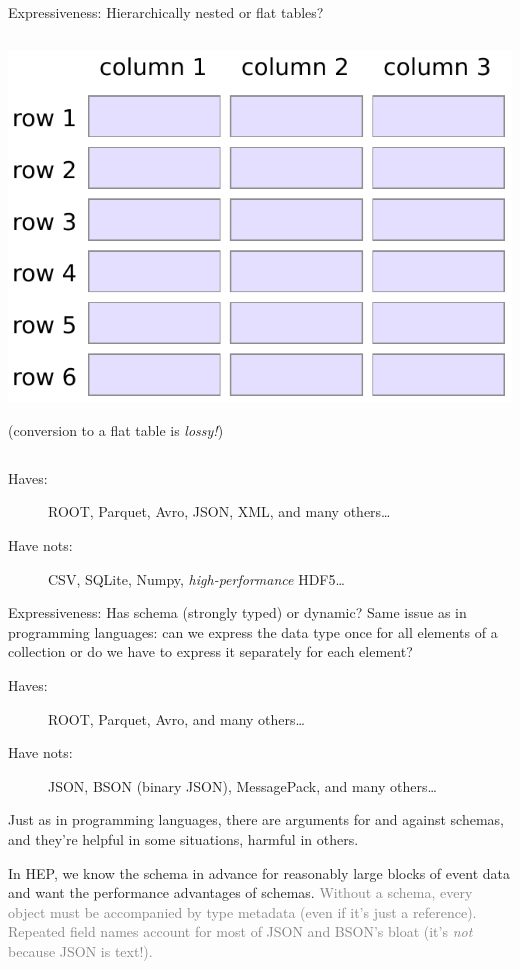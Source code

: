 \documentclass[aspectratio=169]{beamer}
\begin{document}
\begin{frame}{Expressiveness: Hierarchically nested or flat tables?}
\begin{columns}[t]
\begin{center}
\vspace{0.2 cm}
\includegraphics[width=0.7\linewidth]{table-structure.pdf}

\small (conversion to a flat table is {\it lossy!})

\end{center}
\end{columns}

\vspace{0.25 cm}

\begin{description}
\item[Haves:] ROOT, Parquet, Avro, JSON, XML, and many others\ldots
\item[Have nots:] CSV, SQLite, Numpy, {\it high-performance} HDF5\ldots
\end{description}
\end{frame}

\begin{frame}{Expressiveness: Has schema (strongly typed) or dynamic?}
\vspace{0.5 cm}
Same issue as in programming languages: can we express the data type once for all elements of a collection or do we have to express it separately for each element?

\vfill

\begin{description}
\item[Haves:] ROOT, Parquet, Avro, and many others\ldots
\item[Have nots:] JSON, BSON (binary JSON), MessagePack, and many others\ldots
\end{description}

\vfill

Just as in programming languages, there are arguments for and against schemas, and they're helpful in some situations, harmful in others.

\vfill

In HEP, we know the schema in advance for reasonably large blocks of event data and want the performance advantages of schemas. \textcolor{gray}{Without a schema, every object must be accompanied by type metadata (even if it's just a reference). Repeated field names account for most of JSON and BSON's bloat (it's {\it not} because JSON is text!).}
\end{frame}
\end{document}

